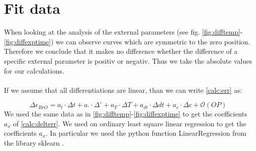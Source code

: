 \documentclass  [
  paper    = a4,
  BCOR     = 10mm,
  twoside,
  fontsize = 12pt,
  fleqn,
  toc      = bibnumbered,
  toc      = listofnumbered,
  numbers  = noendperiod,
  headings = normal,
  listof   = leveldown,
  version  = 3.03
]                                       {scrreprt}
\begin{document}
	
	\section{Fit data}
	When looking at the analysis of the external parameters (see fig. \ref{fig:difftemp}-\ref{fig:diffexptime}) we can observe curves which are symmetric to the zero position. Therefore we conclude that it makes no difference whether the difference of a specific external parameter is positiv or negativ. Thus we take the absolute values for our calculations.\\
	\\
	If we assume that all differentiations are linear, than we can write \cref{calc:err}
	as:  
	
	\begin{equation}
		\Delta \epsilon_{BrO} = a_{t}\cdot\Delta t+a_{^{\circ}}\cdot\Delta ^{\circ}+a_{T}\cdot\Delta T+a_{dt}\cdot\Delta dt +a_{c}\cdot\Delta c + \mathcal{O}\left(OP\right)
		\label{calc:delterr}
	\end{equation}
	We used the same data as in \cref{fig:difftemp}-\ref{fig:diffexptime} to get the coefficients $a_{x}$ of \cref{calc:delterr}. We used on ordinary least square linear regression to get the coefficients $a_{x}$. In particular we used the python function LinearRegression from the library sklearn \cite{SKlearn}.  
	
\end{document}
